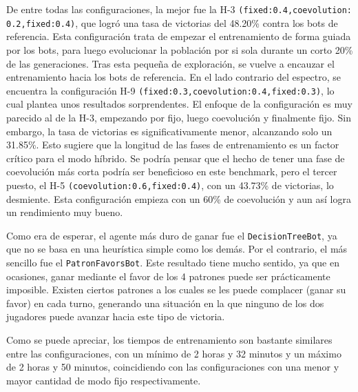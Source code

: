 De entre todas las configuraciones, la mejor fue la H-3 \texttt{(fixed:0.4,coevolution: 0.2,fixed:0.4)}, que logró una tasa de victorias del 48.20\% contra los bots de referencia. Esta configuración trata de empezar el entrenamiento de forma guiada por los bots, para luego evolucionar la población por si sola durante un corto 20\% de las generaciones. Tras esta pequeña de exploración, se vuelve a encauzar el entrenamiento hacia los bots de referencia. En el lado contrario del espectro, se encuentra la configuración H-9 \texttt{(fixed:0.3,coevolution:0.4,fixed:0.3)}, lo cual plantea unos resultados sorprendentes. El enfoque de la configuración es muy parecido al de la H-3, empezando por fijo, luego coevolución y finalmente fijo. Sin embargo, la tasa de victorias es significativamente menor, alcanzando solo un 31.85\%. Esto sugiere que la longitud de las fases de entrenamiento es un factor crítico para el modo híbrido. Se podría pensar que el hecho de tener una fase de coevolución más corta podría ser beneficioso en este benchmark, pero el tercer puesto, el H-5 \texttt{(coevolution:0.6,fixed:0.4)}, con un 43.73\% de victorias, lo desmiente. Esta configuración empieza con un 60\% de coevolución y aun así logra un rendimiento muy bueno.

Como era de esperar, el agente más duro de ganar fue el \texttt{DecisionTreeBot}, ya que no se basa en una heurística simple como los demás. Por el contrario, el más sencillo fue el \texttt{PatronFavorsBot}. Este resultado tiene mucho sentido, ya que en ocasiones, ganar mediante el favor de los 4 patrones puede ser prácticamente imposible. Existen ciertos patrones a los cuales se les puede complacer (ganar su favor) en cada turno, generando una situación en la que ninguno de los dos jugadores puede avanzar hacia este tipo de victoria.

Como se puede apreciar, los tiempos de entrenamiento son bastante similares entre las configuraciones, con un mínimo de 2 horas y 32 minutos y un máximo de 2 horas y 50 minutos, coincidiendo con las configuraciones con una menor y mayor cantidad de modo fijo respectivamente.

